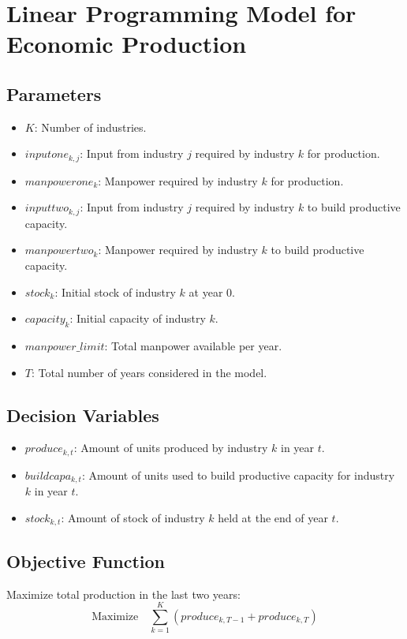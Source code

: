 \documentclass{article}
\begin{document}
\section*{Linear Programming Model for Economic Production}

\subsection*{Parameters}
\begin{itemize}
    \item $K$: Number of industries.
    \item $inputone_{k, j}$: Input from industry $j$ required by industry $k$ for production.
    \item $manpowerone_{k}$: Manpower required by industry $k$ for production.
    \item $inputtwo_{k, j}$: Input from industry $j$ required by industry $k$ to build productive capacity.
    \item $manpowertwo_{k}$: Manpower required by industry $k$ to build productive capacity.
    \item $stock_{k}$: Initial stock of industry $k$ at year 0.
    \item $capacity_{k}$: Initial capacity of industry $k$.
    \item $manpower\_limit$: Total manpower available per year.
    \item $T$: Total number of years considered in the model.
\end{itemize}

\subsection*{Decision Variables}
\begin{itemize}
    \item $produce_{k, t}$: Amount of units produced by industry $k$ in year $t$.
    \item $buildcapa_{k, t}$: Amount of units used to build productive capacity for industry $k$ in year $t$.
    \item $stock_{k, t}$: Amount of stock of industry $k$ held at the end of year $t$.
\end{itemize}

\subsection*{Objective Function}
Maximize total production in the last two years:
\[
\text{Maximize} \quad \sum_{k=1}^{K} (produce_{k, T-1} + produce_{k, T})
\]
\end{document}
